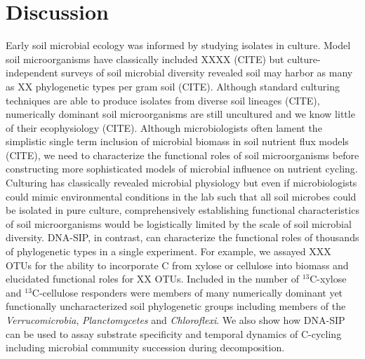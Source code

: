 \section{Discussion}
Early soil microbial ecology was informed by studying isolates in culture. 
Model soil microorganisms have classically included  XXXX
(CITE) but culture-independent surveys of soil microbial diversity revealed
soil may harbor as many as XX phylogenetic types per gram soil (CITE). Although
standard culturing techniques are able to produce isolates from diverse soil
lineages (CITE), numerically dominant soil microorganisms are still uncultured
and we know little of their ecophysiology (CITE). Although microbiologists
often lament the simplistic single term inclusion of microbial biomass in soil
nutrient flux models (CITE), we need to characterize the functional roles of
soil microorganisms before constructing more sophisticated models of microbial
influence on nutrient cycling. Culturing has classically revealed microbial
physiology but even if microbiologists could mimic environmental conditions in
the lab such that all soil microbes could be isolated in pure culture,
comprehensively establishing functional characteristics of soil microorganisms
would be logistically limited by the scale of soil microbial diversity.
DNA-SIP, in contrast, can characterize the functional roles of thousands of
phylogenetic types in a single experiment. For example, we assayed XXX
OTUs for the ability to incorporate C from xylose or cellulose into biomass and
elucidated functional roles for XX OTUs. Included in the number of
$^{13}$C-xylose and $^{13}$C-cellulose responders were members of many
numerically dominant yet functionally uncharacterized soil phylogenetic groups
including members of the \textit{Verrucomicrobia}, \textit{Planctomycetes} and
\textit{Chloroflexi}. We also show how DNA-SIP can be used to assay substrate
specificity and temporal dynamics of C-cycling including microbial community
succession during decomposition.

